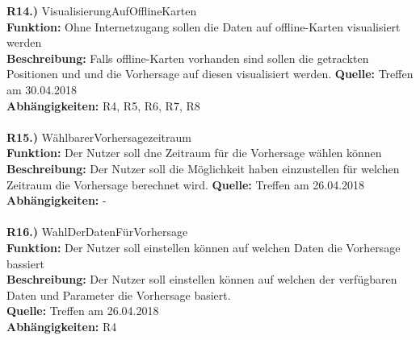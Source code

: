 \documentclass{article}
\begin{document}
	\textbf{R14.)} VisualisierungAufOfflineKarten\\
	\textbf{Funktion:} Ohne Internetzugang sollen die Daten auf offline-Karten visualisiert werden\\
	\textbf{Beschreibung:} Falls offline-Karten vorhanden sind sollen die getrackten Positionen und und die Vorhersage auf diesen visualisiert werden.
	\textbf{Quelle:} Treffen am 30.04.2018\\
	\textbf{Abhängigkeiten:} R4, R5, R6, R7, R8\\\\
	
	\textbf{R15.)} WählbarerVorhersagezeitraum\\
	\textbf{Funktion:} Der Nutzer soll dne Zeitraum für die Vorhersage wählen können\\
	\textbf{Beschreibung:} Der Nutzer soll die Möglichkeit haben einzustellen für welchen Zeitraum die Vorhersage berechnet wird.
	\textbf{Quelle:} Treffen am 26.04.2018\\
	\textbf{Abhängigkeiten:} - \\\\
	
	\textbf{R16.)} WahlDerDatenFürVorhersage\\
	\textbf{Funktion:} Der Nutzer soll einstellen können auf welchen Daten die Vorhersage bassiert\\
	\textbf{Beschreibung:} Der Nutzer soll einstellen können auf welchen der verfügbaren Daten und Parameter die Vorhersage basiert.\\
	\textbf{Quelle:} Treffen am 26.04.2018\\
	\textbf{Abhängigkeiten:} R4 \\\\
	
\end{document}

